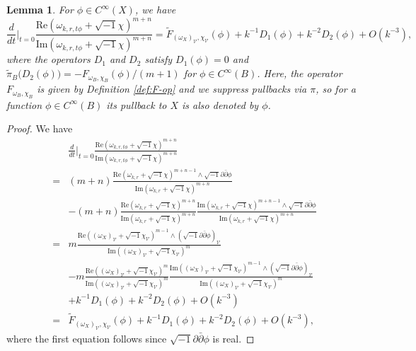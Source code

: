 \documentclass[10pt,a4paper]{amsart}
\newtheorem{lemma}{Lemma}
\begin{document}
\begin{lemma}
 For $\phi \in C^\infty(X)$, we have
$$\frac{d}{dt}\Big|_{t = 0}\frac{\mathrm{Re}(\omega_{k,r,t\phi}+\sqrt{-1}\chi)^{m+n}}{\mathrm{Im}(\omega_{k,r,t\phi}+\sqrt{-1}\chi)^{m+n}}
= \tilde{F}_{ \left( \omega_X \right)_\mathcal{V}, \chi_\mathcal{V}} \left(\phi \right) + k^{-1}D_1(\phi) + k^{-2}D_2(\phi)+O(k^{-3}),$$
where the operators $D_1$ and $D_2$ satisfy $D_1(\phi)=0$ and $\tilde{\pi}_B\bigl(D_2(\phi)\bigr)=-F_{\omega_B,\chi_B}(\phi)/(m+1)$ for $\phi\in C^\infty(B)$. Here, the operator $F_{\omega_B,\chi_B}$ is given by Definition \ref{def:F-op} and we suppress pullbacks via $\pi$,
so for a function $\phi\in C^\infty(B)$ its pullback to $X$ is also denoted by $\phi$.
\end{lemma}

\begin{proof}
    We have
    \begin{align*}
        &\frac{d}{dt}\Big|_{t = 0}\frac{\mathrm{Re}(\omega_{k,r,t\phi}+\sqrt{-1}\chi)^{m+n}}{\mathrm{Im}(\omega_{k,r,t\phi}+\sqrt{-1}\chi)^{m+n}}\\
        =&(m+n)\frac{\mathrm{Re}(\omega_{k,r}+\sqrt{-1}\chi)^{m+n-1}\wedge\sqrt{-1}\partial\bar{\partial}\phi}{\mathrm{Im}(\omega_{k,r}+\sqrt{-1}\chi)^{m+n}}\\
        &-(m+n)\frac{\mathrm{Re}(\omega_{k,r}+\sqrt{-1}\chi)^{m+n}}{\mathrm{Im}(\omega_{k,r}+\sqrt{-1}\chi)^{m+n}}\frac{\mathrm{Im}(\omega_{k,r}+\sqrt{-1}\chi)^{m+n-1}\wedge\sqrt{-1}\partial\bar{\partial}\phi}{\mathrm{Im}(\omega_{k,r}+\sqrt{-1}\chi)^{m+n}}\\
        =&m\frac{\mathrm{Re}((\omega_X)_\mathcal{V}+\sqrt{-1}\chi_\mathcal{V})^{m-1}\wedge(\sqrt{-1}\partial\bar{\partial}\phi)_\mathcal{V}}{\mathrm{Im}((\omega_X)_\mathcal{V}+\sqrt{-1}\chi_\mathcal{V})^m}\\
        &-m\frac{\mathrm{Re}((\omega_X)_\mathcal{V}+\sqrt{-1}\chi_\mathcal{V})^m}{\mathrm{Im}((\omega_X)_\mathcal
        V+\sqrt{-1}\chi_\mathcal{V})^m}\frac{\mathrm{Im}((\omega_X)_\mathcal{V}+\sqrt{-1}\chi_\mathcal{V})^{m-1}\wedge(\sqrt{-1}\partial\bar{\partial}\phi)_\mathcal{V}}{\mathrm{Im}((\omega_X)_\mathcal{V}+\sqrt{-1}\chi_\mathcal{V})^m}\\
        &+k^{-1}D_1(\phi)+k^{-2}D_2(\phi)+O(k^{-3})\\
        =&\tilde{F}_{(\omega_X)_\mathcal{V},\chi_\mathcal{V}}(\phi)+k^{-1}D_1(\phi)+k^{-2}D_2(\phi)+O(k^{-3}),
    \end{align*}
    where the first equation follows since $\sqrt{-1}\partial\bar{\partial}\phi$ is real.

\end{proof}
\end{document}
